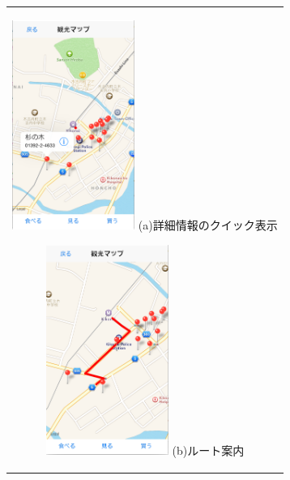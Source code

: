 \begin{figure}[htbp]
  \begin{center}
    \begin{tabular}{c}

      \begin{minipage}{0.33\hsize}
        \begin{center}
\includegraphics[width=4cm, bb=0 0 322 550]{5.3_map1.png}
          \hspace{1cm} %
          {\footnotesize (a)詳細情報のクイック表示}
        \end{center}
      \end{minipage}

      \begin{minipage}{0.33\hsize}
        \begin{center}
\includegraphics[width=4cm, bb=0 0 321 550]{5.3_map2.png}
          \hspace{1cm} %
          {\footnotesize (b)ルート案内}
        \end{center}
      \end{minipage}


\end{tabular}
\end{center}
\end{figure}
